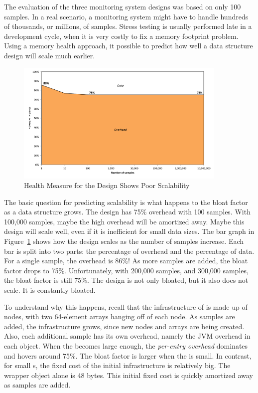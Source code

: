 The evaluation of the three monitoring system designs was based on only 100
samples. In a real scenario, a monitoring system might have to handle hundreds
of thousands, or millions, of samples. Stress testing is usually performed late
in a development cycle, when it is very costly to fix a memory footprint
problem. Using a memory health approach, it possible to predict how well a data
structure design will scale much earlier.
 
\begin{figure}
  \centering
   \includegraphics[width=0.9\textwidth]{part1/Figures/memoryhealth/scalable-health-treemap}
  \caption{Health Measure for the  Design Shows Poor Scalability}
  \label{fig:scalable-health-treemap}
\end{figure}
The basic question for predicting scalability is what happens to the bloat
factor as a data structure grows. The  design has 75\% overhead
with 100 samples. With 100,000 samples, maybe the high overhead will be
amortized away. Maybe this design will scale well, even if it is inefficient for
small data sizes. The bar graph in Figure~\ref{fig:scalable-health-treemap}
shows how the  design scales as the number of samples increase.
Each bar is split into two parts: the percentage of overhead and the percentage
of data. For a single sample, the overhead is 86\%! As more samples are added,
the bloat factor drops to 75\%. Unfortunately, with 200,000 samples, and 300,000
samples, the bloat factor is still 75\%. The  design is not only
bloated, but it also does not scale. It is constantly bloated.

To understand why this happens, recall that the infrastructure of 
is made up of nodes, with two 64-element arrays hanging off of each node. As
samples are added, the infrastructure grows, since new nodes and arrays are
being created. Also, each additional sample has its own overhead, namely the JVM
overhead in each  object. When the  becomes large
enough, the \textit{per-entry overhead} dominates and hovers around 75\%. The
bloat factor is larger when the  is small. In contrast, for small
s, the fixed cost of the initial  infrastructure is
relatively big. The  wrapper object alone is 48 bytes. This
initial fixed cost is quickly amortized away as samples are added.

